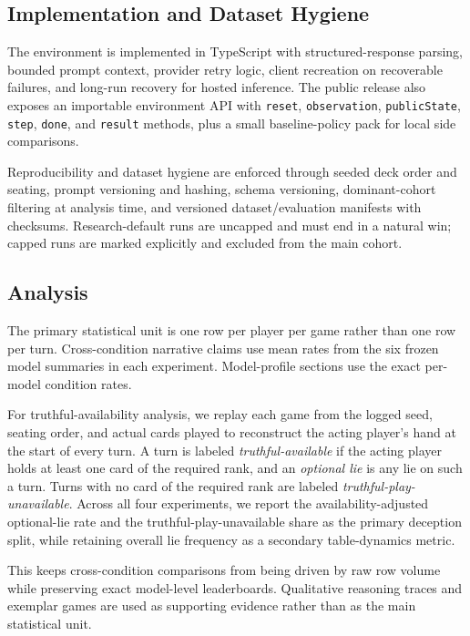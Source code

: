 \subsection{Implementation and Dataset Hygiene}

The environment is implemented in TypeScript with structured-response parsing, bounded prompt context, provider retry logic, client recreation on recoverable failures, and long-run recovery for hosted inference. The public release also exposes an importable environment API with \texttt{reset}, \texttt{observation}, \texttt{publicState}, \texttt{step}, \texttt{done}, and \texttt{result} methods, plus a small baseline-policy pack for local side comparisons.

Reproducibility and dataset hygiene are enforced through seeded deck order and seating, prompt versioning and hashing, schema versioning, dominant-cohort filtering at analysis time, and versioned dataset/evaluation manifests with checksums. Research-default runs are uncapped and must end in a natural win; capped runs are marked explicitly and excluded from the main cohort.

\subsection{Analysis}

The primary statistical unit is one row per player per game rather than one row per turn. Cross-condition narrative claims use mean rates from the six frozen model summaries in each experiment. Model-profile sections use the exact per-model condition rates.

For truthful-availability analysis, we replay each game from the logged seed, seating order, and actual cards played to reconstruct the acting player's hand at the start of every turn. A turn is labeled \emph{truthful-available} if the acting player holds at least one card of the required rank, and an \emph{optional lie} is any lie on such a turn. Turns with no card of the required rank are labeled \emph{truthful-play-unavailable}. Across all four experiments, we report the availability-adjusted optional-lie rate and the truthful-play-unavailable share as the primary deception split, while retaining overall lie frequency as a secondary table-dynamics metric.

This keeps cross-condition comparisons from being driven by raw row volume while preserving exact model-level leaderboards. Qualitative reasoning traces and exemplar games are used as supporting evidence rather than as the main statistical unit.

